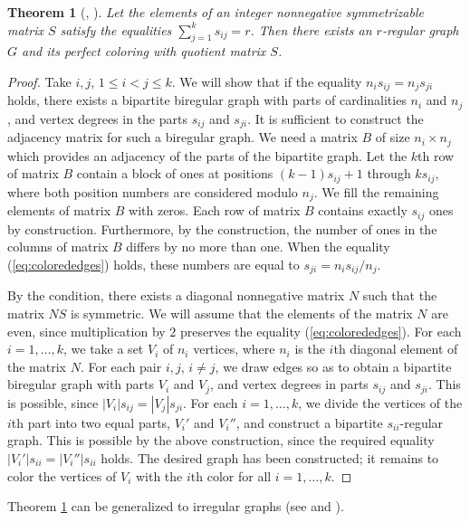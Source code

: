 \documentclass[11pt]{article}
\newtheorem{theorem}{Theorem}[section]
\theoremstyle{definition}
\begin{document}
\begin{theorem}[\cite{Kir}, \cite{25}]\label{thAF}
Let the elements of an integer nonnegative symmetrizable matrix
$S$ satisfy the equalities $\sum_{j=1}^k s_{ij}=r$.
Then there exists an $r$-regular graph $G$ and its perfect coloring with quotient matrix $S$.
\end{theorem}
\begin{proof}
Take $i, j$, $1\leq i<j\leq k$.
We will show that if the equality $n_i
s_{ij}=n_js_{ji}$ holds, there exists a bipartite biregular graph with parts of cardinalities
 $n_i$ and $n_j$, and vertex degrees in the parts $s_{ij}$ and $s_{ji}$.
It is sufficient to construct the adjacency matrix for  such a biregular graph.  We need  a matrix  $B$  of size
$n_i\times n_j$ which  provides an adjacency of the parts of the  bipartite  graph.   Let the $k$th row
of matrix $B$ contain a block of ones at positions $(k-1)s_{ij}+1$ through
$ks_{ij}$, where both position numbers are considered modulo $n_j$.
We fill the remaining elements of matrix $B$ with zeros. Each row
of matrix $B$ contains exactly $s_{ij}$ ones by  construction. Furthermore, by the construction, the number of ones in the columns of matrix $B$ differs by no more than one. When the equality
(\ref{eq:colorededges}) holds, these numbers are equal to
$s_{ji}=n_i s_{ij}/n_j$.



By the condition, there exists a diagonal nonnegative matrix $N$ such that the matrix $NS$ is symmetric. We will assume that the elements of the matrix $N$ are even, since multiplication by $2$ preserves the equality
(\ref{eq:colorededges}). For each $i=1,\dots,k$, we take a set
$V_i$ of $n_i$ vertices, where $n_i$ is the $i$th diagonal element
of the matrix $N$. For each pair $i,j$, $i\neq j$, we draw edges so as
to obtain a bipartite biregular graph with parts $V_i$ and
$V_j$, and vertex degrees in parts $s_{ij}$ and $s_{ji}$. This is possible,
since $|V_i|s_{ij}=|V_j|s_{ji}$. For each $i=1,\dots,k$, we divide the vertices of the $i$th part into two equal parts, $V_i'$ and $V_i''$, and construct a bipartite $s_{ii}$-regular graph. This is possible by the  above construction,
since the required equality
$|V_i'|s_{ii}=|V_i''|s_{ii}$ holds. The desired graph has been constructed; it remains to
color the vertices of $V_i$ with the $i$th color for all $i=1,\dots,k$.
\end{proof}


Theorem \ref{thAF} can be generalized
to irregular graphs (see \cite{25} and \cite{Lei}).
\end{document}
